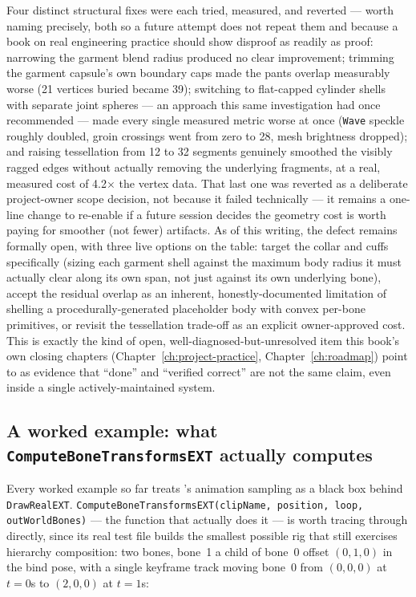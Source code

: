 Four distinct structural fixes were each tried, measured, and reverted --- worth naming
precisely, both so a future attempt does not repeat them and because a book on real engineering
practice should show disproof as readily as proof: narrowing the garment blend radius produced
no clear improvement; trimming the garment capsule's own boundary caps made the pants overlap
measurably worse (21 vertices buried became 39); switching to flat-capped cylinder shells with
separate joint spheres --- an approach this same investigation had once recommended --- made
every single measured metric worse at once (\texttt{Wave} speckle roughly doubled, groin
crossings went from zero to 28, mesh brightness dropped); and raising tessellation from 12 to
32 segments genuinely smoothed the visibly ragged edges without actually removing the
underlying fragments, at a real, measured cost of 4.2$\times$ the vertex data. That last one
was reverted as a deliberate project-owner scope decision, not because it failed technically ---
it remains a one-line change to re-enable if a future session decides the geometry cost is
worth paying for smoother (not fewer) artifacts. As of this writing, the defect remains
formally open, with three live options on the table: target the collar and cuffs specifically
(sizing each garment shell against the maximum body radius it must actually clear along its
own span, not just against its own underlying bone), accept the residual overlap as an
inherent, honestly-documented limitation of shelling a procedurally-generated placeholder body
with convex per-bone primitives, or revisit the tessellation trade-off as an explicit
owner-approved cost. This is exactly the kind of open, well-diagnosed-but-unresolved item this
book's own closing chapters (Chapter~\ref{ch:project-practice}, Chapter~\ref{ch:roadmap}) point to as evidence that ``done'' and
``verified correct'' are not the same claim, even inside a single actively-maintained system.

\subsection{A worked example: what \texttt{ComputeBoneTransformsEXT} actually computes}

Every worked example so far treats 's animation sampling as a black
box behind \texttt{DrawRealEXT}. \texttt{ComputeBoneTransformsEXT(clipName, position, loop,
outWorldBones)} --- the function that actually does it --- is worth tracing through directly,
since its real test file builds the smallest possible rig that still exercises hierarchy
composition: two bones, bone~1 a child of bone~0 offset $(0,1,0)$ in the bind pose, with a
single keyframe track moving bone~0 from $(0,0,0)$ at $t{=}0$s to $(2,0,0)$ at $t{=}1$s:

